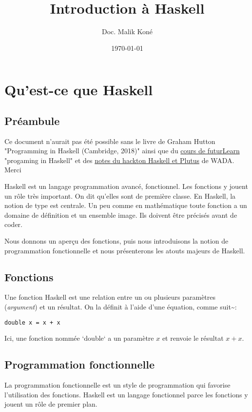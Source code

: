 \documentclass[11pt]{article}
\author{Doc. Malik Koné}
\date{\today}
\title{Introduction à Haskell}
\begin{document}
\maketitle
\setcounter{tocdepth}{2}
\tableofcontents



\section{Qu'est-ce que Haskell}
\label{sec:org3cf5073}
\subsection{Préambule}
\label{sec:org61fb428}
Ce document n'aurait pas été possible sans le livre de Graham Hutton "Programming in Haskell (Cambridge, 2018)" ainsi que du \href{https://www.futurelearn.com/courses/functional-programming-haskell}{cours de futurLearn} "progaming in Haskell"  et des \href{https://github.com/WADAlliance/Haskell\_Plutus\_Course}{notes du hackton Haskell et Plutus} de WADA.  Merci


Haskell est un langage programmation avancé, fonctionnel. Les fonctions y jouent un rôle très important.  On dit qu'elles sont de première classe.   En Haskell, la notion de type est centrale.   Un peu comme en mathématique toute fonction a un domaine de définition et un ensemble image.  Ils doivent être précisés avant de coder.

Nous donnons un aperçu des fonctions,  puis nous introduisons la notion de programmation fonctionnelle et nous présenterons les atouts majeurs de Haskell.

\subsection{Fonctions}
\label{sec:orgda3ee8b}
Une fonction Haskell est une relation entre un ou plusieurs paramètres (\emph{argument}) et un résultat.   On la définit à l'aide d'une équation, comme suit\textasciitilde{}:

\begin{verbatim}
double x = x + x
\end{verbatim}

Ici, une fonction nommée `double` a un paramètre \(x\) et renvoie le résultat \(x + x\).

\subsection{Programmation fonctionnelle}
\label{sec:orge90b8dd}
La programmation fonctionnelle est un style de programmation qui favorise l'utilisation des fonctions.  Haskell est un langage fonctionnel parce les fonctions y jouent un rôle de premier plan.
\end{document}
